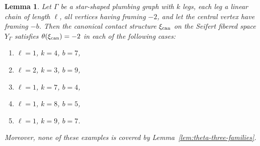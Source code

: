 \documentclass[11pt]{amsart}
\theoremstyle{plain}
\newtheorem{lemma}[theorem]{Lemma}
\theoremstyle{definition}
\theoremstyle{remark}
\begin{document}
\begin{lemma}\label{lem:theta-sporadic-examples}
Let $\Gamma$ be a star-shaped plumbing graph with $k$ legs, each leg a linear chain of length $\ell$, all vertices having framing $-2$, and let the central vertex have framing $-b$. Then the canonical contact structure $\xi_{\rm can}$ on the Seifert fibered space $Y_\Gamma$ satisfies $\theta(\xi_{\rm can})=-2$ in each of the following cases:
\begin{enumerate}
\item[(1)] $\ell=1$, $k=4$, $b=7$,
\item[(2)] $\ell=2$, $k=3$, $b=9$,
\item[(3)] $\ell=1$, $k=7$, $b=4$,
\item[(4)] $\ell=1$, $k=8$, $b=5$,
\item[(5)] $\ell=1$, $k=9$, $b=7$.
\end{enumerate}
Moreover, none of these examples is covered by Lemma~\ref{lem:theta-three-families}.
\end{lemma}
\end{document}
